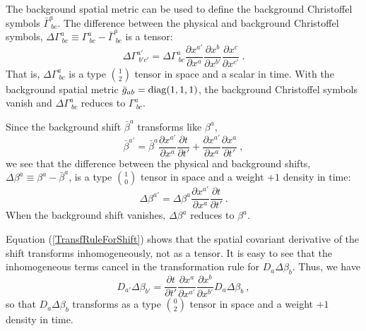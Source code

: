 \documentclass[letterpaper,nofootinbib,prd,amsmath,onecolumn]{revtex4-1}
\begin{document}
The background spatial metric can be used to define the background Christoffel symbols $\bar\Gamma^a_{~bc}$. The difference between 
the physical and background Christoffel symbols, $\Delta \Gamma^{a}_{~bc} \equiv \Gamma^{a}_{~bc} - {\bar \Gamma}^{a}_{~bc}$ is a tensor:
\begin{equation}
\Delta \Gamma^{a'}_{~b'c'} = \Delta \Gamma^{a}_{~bc}\frac{\partial x^{a'}}{\partial x^{a}}\frac{\partial x^{b}}
{\partial x^{b'}}\frac{\partial x^{c}}{\partial x^{c'}} \ .
\end{equation}
That is, $\Delta \Gamma^{a}_{~bc}$ is a type $1 \choose 2$ tensor in space and a scalar in time. With the background spatial metric 
$\bar g_{ab} = {\rm diag}(1,1,1)$, the background Christoffel symbols vanish and $\Delta\Gamma^a_{~bc}$ reduces to $\Gamma^a_{~bc}$. 

Since the background shift ${\bar \beta}^{a}$ transforms like $\beta^{a}$, 
\[
{\bar \beta}^{a'} = {\bar \beta}^{a}\frac{\partial x^{a'}}{\partial x^{a}}\frac{\partial t}{\partial t'} 
+ \frac{\partial x^{a'}}{\partial x^{a}}\frac{\partial x^{a}}{\partial t'} \ ,
\]
we see that the difference between the physical and background shifts, $\Delta\beta^a \equiv \beta^{a} - {\bar \beta}^{a}$, 
is a type $1 \choose 0$ tensor in space and a weight $+1$ density in time:
\begin{equation}
\Delta \beta^{a'} = \Delta \beta^{a}\frac{\partial x^{a'}}{\partial x^{a}}\frac{\partial t}{\partial t'} \ .
\end{equation}
When the background shift vanishes, $\Delta\beta^a$ reduces to $\beta^a$. 

Equation (\ref{TransfRuleForShift}) shows that the spatial covariant derivative of the shift transforms inhomogeneously, not as a tensor. It is 
easy to see that the inhomogeneous terms cancel in the transformation rule for  $D_a\Delta\beta_b$. Thus, we have 
\begin{equation} \label{TransfRuleForDeltaShift}
D_{a'}\Delta\beta_{b'} =  \frac{\partial t}{\partial t'}\frac{\partial x^{a}}{\partial x^{a'}}\frac{\partial x^{b}}{\partial x^{b'}}  
D_{a}\Delta\beta_{b} \ ,
\end{equation}
so that $D_{a}\Delta\beta_{b} $ transforms as a type $0\choose 2$ tensor in space and a weight $+1$ density in time. 
\end{document}

